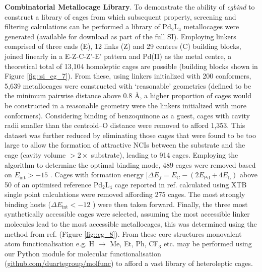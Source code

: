\documentclass[../../main.tex]{subfiles}
\newcommand{\cgbind}{\emph{cgbind }}
\begin{document}
{\bfseries{Combinatorial Metallocage Library}}. To demonstrate the ability of \cgbind to construct a library of cages from which subsequent property, screening and filtering calculations can be performed a library of Pd$_2$L$_4$ metallocages were generated (available for download as part of the full SI). Employing linkers comprised of three ends (E), 12 links (Z) and 29 centres (C) building blocks, joined linearly in a E-Z-C-Z’-E’ pattern and Pd(II) as the metal centre, a theoretical total of 13,104 homoleptic cages are possible (building blocks shown in Figure \ref{fig::si_cg_7}). From these, using linkers initialized with 200 conformers, 5,639 metallocages were constructed with ‘reasonable’ geometries (defined to be the minimum pairwise distance above 0.8 \AA, a higher proportion of cages would be constructed in a reasonable geometry were the linkers initialized with more conformers). Considering binding of benzoquinone as a guest, cages with cavity radii smaller than the centroid–O distance were removed to afford 1,353. This dataset was further reduced by eliminating those cages that were found to be too large to allow the formation of attractive NCIs between the substrate and the cage (cavity volume $>2\times$ substrate), leading to 914 cages. Employing the algorithm  to determine the optimal binding mode, 489 cages were removed based on $E_\text{int} > -15$ \kcal. Cages with formation energy [$\Delta E_f = E_\text{C} - (2E_\text{Pd} + 4E_\text{L})$ above 50 \kcalx of an optimised reference Pd$_2$L$_4$ cage reported in ref. \cite{August2016} calculated using XTB single point calculations were removed affording 275 cages. The most strongly binding hosts ($\Delta E_\text{int} < -12$ \kcal) were then taken forward. Finally, the three most synthetically accessible cages were selected, assuming the most accessible linker molecules lead to the most accessible metallocages, this was determined using the method from ref. \cite{Ertl2009} (Figure \ref{fig::cg_8}). From these core structures monovalent atom functionalisation e.g. H $\rightarrow$ Me, Et, Ph, CF$_3$ etc. may be performed using our Python module for molecular functionalisation ({\url{github.com/duartegroup/molfunc}}) to afford a vast library of heteroleptic cages.
\end{document}
